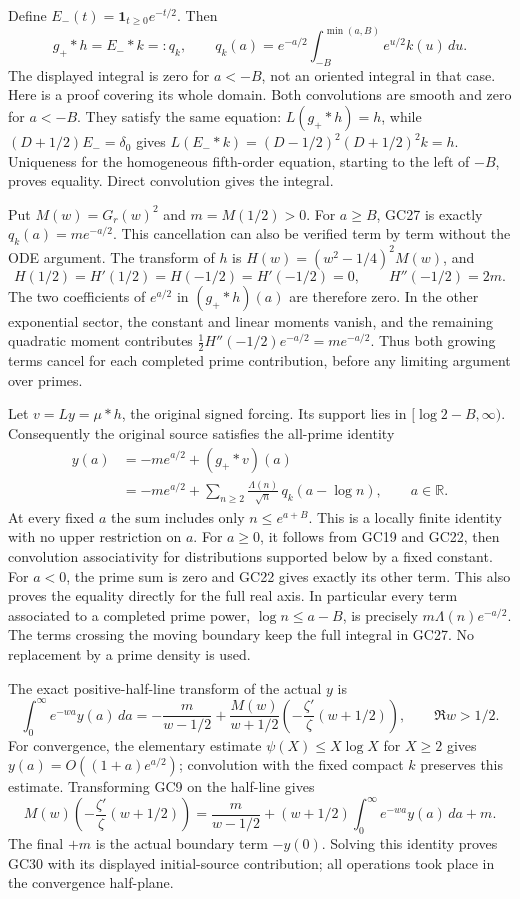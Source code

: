 Define \(E_-(t)=\mathbf1_{t\ge0}e^{-t/2}\). Then
\[
\boxed{g_+*h=E_-*k=:q_k,\qquad
q_k(a)=e^{-a/2}\int_{-B}^{\min(a,B)}e^{u/2}k(u)\,du.}\tag{GC27}
\]
The displayed integral is zero for \(a<-B\), not an oriented integral
in that case. Here is a proof covering its whole domain. Both
convolutions are smooth and zero for \(a<-B\). They satisfy the same
equation: \(L(g_+*h)=h\), while
\((D+1/2)E_-=\delta_0\) gives
\(L(E_-*k)=(D-1/2)^2(D+1/2)^2k=h\).
Uniqueness for the homogeneous fifth-order equation, starting to the
left of \(-B\), proves equality. Direct convolution gives the integral.

Put \(M(w)=G_r(w)^2\) and \(m=M(1/2)>0\). For \(a\ge B\), GC27 is
exactly \(q_k(a)=m e^{-a/2}\). This cancellation can also be verified
term by term without the ODE argument. The transform of \(h\) is
\(H(w)=(w^2-1/4)^2M(w)\), and
\[
H(1/2)=H'(1/2)=H(-1/2)=H'(-1/2)=0,\qquad
H''(-1/2)=2m.\tag{GC28}
\]
The two coefficients of \(e^{a/2}\) in \((g_+*h)(a)\) are therefore
zero. In the other exponential sector, the constant and linear moments
vanish, and the remaining quadratic moment contributes
\(\tfrac12 H''(-1/2)e^{-a/2}=m e^{-a/2}\).
Thus both growing terms cancel for each completed prime contribution,
before any limiting argument over primes.

Let \(v=Ly=\mu*h\), the original signed forcing. Its support lies in
\([\log2-B,\infty)\). Consequently the original source satisfies
the all-prime identity
\[
\begin{split}
y(a)&=-m e^{a/2}+(g_+*v)(a)\\
&=-m e^{a/2}
 +\sum_{n\ge2}\frac{\Lambda(n)}{\sqrt n}\,q_k(a-\log n),
\qquad a\in\mathbb R.
\end{split}\tag{GC29}
\]
At every fixed \(a\) the sum includes only \(n\le e^{a+B}\).
This is a locally finite identity with no upper restriction on \(a\).
For \(a\ge0\), it follows from GC19 and GC22, then convolution
associativity for distributions supported below by a fixed constant.
For \(a<0\), the prime sum is zero and GC22 gives exactly its other
term. This also proves the equality directly for the full real axis.
In particular every term associated to a completed prime power,
\(\log n\le a-B\), is precisely
\(m\Lambda(n)e^{-a/2}\). The terms crossing the moving boundary keep
the full integral in GC27. No replacement by a prime density is used.

The exact positive-half-line transform of the actual \(y\) is
\[
\boxed{\int_0^\infty e^{-wa}y(a)\,da
=-\frac{m}{w-1/2}
 +\frac{M(w)}{w+1/2}
       \left(-\frac{\zeta'}{\zeta}(w+1/2)\right),
\qquad\Re w>1/2.}\tag{GC30}
\]
For convergence, the elementary estimate
\(\psi(X)\le X\log X\) for \(X\ge2\) gives
\(y(a)=O((1+a)e^{a/2})\); convolution with the fixed compact \(k\)
preserves this estimate. Transforming GC9 on the half-line gives
\[
M(w)\left(-\frac{\zeta'}{\zeta}(w+1/2)\right)
=\frac{m}{w-1/2}+(w+1/2)\int_0^\infty e^{-wa}y(a)\,da+m.
\]
The final \(+m\) is the actual boundary term \(-y(0)\).
Solving this identity proves GC30 with its displayed initial-source
contribution; all operations took place in the convergence half-plane.

